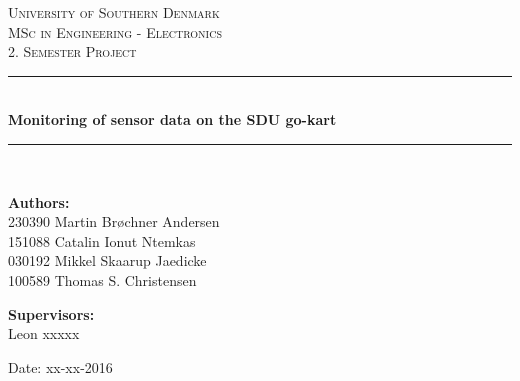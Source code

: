 \begin{titlepage}
\begin{center}

\textsc{\LARGE University of Southern Denmark}\\[1.5cm]
\textsc{\Large MSc in Engineering - Electronics}\\
\textsc{\large 2. Semester Project}\\[0.5cm]

\vfill
\vspace{3cm}
\hrule ~\\[0.3cm]
{ \LARGE \bfseries Monitoring of sensor data on the SDU go-kart\\[0.4cm] }
\hrule ~\\[1.5cm]

\vfill

\vspace{7cm}
\begin{minipage}[t]{.49\textwidth}
\begin{flushleft} \large
\textbf{Authors:}\\
230390 Martin Brøchner Andersen\\
151088 Catalin Ionut Ntemkas\\
030192 Mikkel Skaarup Jaedicke\\
100589 Thomas S. Christensen
\end{flushleft}
\end{minipage}
\begin{minipage}[t]{.49\textwidth}
\begin{flushright} \large
\textbf{Supervisors:} \\
Leon xxxxx
\end{flushright}
\end{minipage}

\vspace{1cm}
Date: xx-xx-2016

\vspace{1cm}

\end{center}
\end{titlepage}